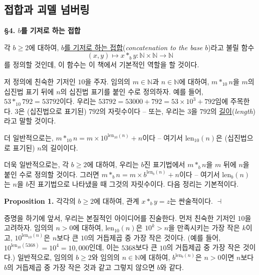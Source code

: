 \documentclass[12pt]{paper}
\newenvironment{context}[1][]
{ \noindent \textbf{{#1}.} }
{ \hfill $ \dashv $ }
\begin{document}
\subsection{접합과 괴델 넘버링}
\hspace{12pt}

\noindent \textbf{\S4. $b$를 기저로 하는 접합}

각 $b \geq 2$에 대하여, \underline{$b$를 기저로 하는 접합}(\textit{concatenation to the base $b$})라고 불릴 함수 $$\left( x , y \right) \mapsto x *_{b} y : \mathbb{N} \times \mathbb{N} \to \mathbb{N}$$를 정의할 것인데,
이 함수는 이 책에서 기본적인 역할을 할 것이다.

저 정의에 친숙한 기저인 $10$을 주자.
임의의 $m \in \mathbb{N}$과 $n \in \mathbb{N}$에 대하여,
$m *_{10} n$을 $m$의 십진법 표기 뒤에 $n$의 십진법 표기를 붙인 수로 정의하자.
예를 들어, $53 *_{10} 792 = 53792$이다.
우리는 $53792 = 53000 + 792 = 53 \times 10^{3} + 792$임에 주목한다.
$3$은 (십진법으로 표기된) $792$의 자릿수이다 --
또는, 우리는 $3$을 $792$의 \underline{길이}(\textit{length})라고 말할 것이다.

더 일반적으로는, $m *_{10} n = m \times 10^{\mathrm{len}_{10} \left( n \right)} + n$이다 --
여기서 $\mathrm{len}_{10} \left( n \right)$은 (십진법으로 표기된) $n$의 길이이다.

더욱 일반적으로는, 각 $b \geq 2$에 대하여,
우리는 $b$진 표기법에서 $m *_{b} n$을 $m$ 뒤에 $n$을 붙인 수로 정의할 것이다.
그러면 $m *_{b} n = m \times b^{\mathrm{len}_{b} \left( n \right)} + n$이다 --
여기서 $\mathrm{len}_{b} \left( n \right)$는 $n$을 $b$진 표기법으로 나타냈을 때 그것의 자릿수이다.
다음 정리는 기본적이다.

\begin{context}[Proposition 1]
각각의 $b \geq 2$에 대하여, 관계 $x *_{b} y = z$는 싼술적이다.
\end{context}

증명을 하기에 앞서, 우리는 본질적인 아이디어를 진술한다.
먼저 친숙한 기저인 $10$을 고려하자.
임의의 $n > 0$에 대하여, $\mathrm{len}_{10} \left( n \right)$은 $10^{k} > n$을 만족시키는 가장 작은 $k$이고,
$10^{\mathrm{len}_{10} \left( n \right)}$은 $n$보다 큰 $10$의 거듭제곱 중 가장 작은 것이다.
(예를 들어, $10^{\mathrm{len}_{10} \left( 5368 \right)} = 10^4 = 10,000$인데, 이는 $5368$보다 큰 $10$의 거듭제곱 중 가장 작은 것이다.)
일반적으로, 임의의 $b \geq 2$와 임의의 $n \in \mathbb{N}$에 대하여,
$b^{\mathrm{len}_{b} \left( n \right)}$은 $n > 0$이면 $n$보다 $b$의 거듭제곱 중 가장 작은 것과 같고 그렇지 않으면 $b$와 같다.
\end{document}
